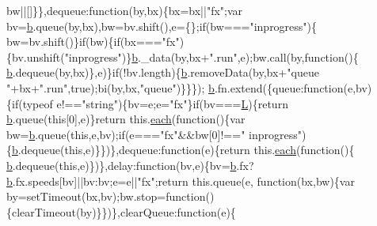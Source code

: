 \begin{DoxyCode}
      bw||[]\}\},dequeue:\textcolor{keyword}{function}(by,bx)\{bx=bx||\textcolor{stringliteral}{"fx"};var bv=\hyperlink{a00039_aa4026ad5544b958e54ce5e106fa1c805}{b}.queue(by,bx),bw=bv.shift(),e=\{\};\textcolor{keywordflow}{if}(bw===\textcolor{stringliteral}{"inprogress"})\{
      bw=bv.shift()\}\textcolor{keywordflow}{if}(bw)\{\textcolor{keywordflow}{if}(bx===\textcolor{stringliteral}{"fx"})\{bv.unshift(\textcolor{stringliteral}{"inprogress"})\}\hyperlink{a00039_aa4026ad5544b958e54ce5e106fa1c805}{b}.\_data(by,bx+\textcolor{stringliteral}{".run"},e);bw.call(by,\textcolor{keyword}{function}()\{
      \hyperlink{a00039_aa4026ad5544b958e54ce5e106fa1c805}{b}.dequeue(by,bx)\},e)\}\textcolor{keywordflow}{if}(!bv.length)\{\hyperlink{a00039_aa4026ad5544b958e54ce5e106fa1c805}{b}.removeData(by,bx+\textcolor{stringliteral}{"queue "}+bx+\textcolor{stringliteral}{".run"},\textcolor{keyword}{true});bi(by,bx,\textcolor{stringliteral}{"queue"})\}\}\});
      \hyperlink{a00039_aa4026ad5544b958e54ce5e106fa1c805}{b}.fn.extend(\{queue:\textcolor{keyword}{function}(e,bv)\{\textcolor{keywordflow}{if}(typeof e!==\textcolor{stringliteral}{"string"})\{bv=e;e=\textcolor{stringliteral}{"fx"}\}\textcolor{keywordflow}{if}(bv===\hyperlink{a00039_a38ee4c0b5f4fe2a18d0c783af540d253}{L})\{\textcolor{keywordflow}{return} 
      \hyperlink{a00039_aa4026ad5544b958e54ce5e106fa1c805}{b}.queue(\textcolor{keyword}{this}[0],e)\}\textcolor{keywordflow}{return} this.\hyperlink{a00039_a871ff39db627c54c710a3e9909b8234c}{each}(\textcolor{keyword}{function}()\{var bw=\hyperlink{a00039_aa4026ad5544b958e54ce5e106fa1c805}{b}.queue(\textcolor{keyword}{this},e,bv);\textcolor{keywordflow}{if}(e===\textcolor{stringliteral}{"fx"}&&bw[0]!==\textcolor{stringliteral}{"
      inprogress"})\{\hyperlink{a00039_aa4026ad5544b958e54ce5e106fa1c805}{b}.dequeue(\textcolor{keyword}{this},e)\}\})\},dequeue:\textcolor{keyword}{function}(e)\{\textcolor{keywordflow}{return} this.\hyperlink{a00039_a871ff39db627c54c710a3e9909b8234c}{each}(\textcolor{keyword}{function}()\{
      \hyperlink{a00039_aa4026ad5544b958e54ce5e106fa1c805}{b}.dequeue(\textcolor{keyword}{this},e)\})\},delay:\textcolor{keyword}{function}(bv,e)\{bv=\hyperlink{a00039_aa4026ad5544b958e54ce5e106fa1c805}{b}.fx?\hyperlink{a00039_aa4026ad5544b958e54ce5e106fa1c805}{b}.fx.speeds[bv]||bv:bv;e=e||\textcolor{stringliteral}{"fx"};\textcolor{keywordflow}{return} this.queue(e,\textcolor{keyword}{
      function}(bx,bw)\{var by=setTimeout(bx,bv);bw.stop=\textcolor{keyword}{function}()\{clearTimeout(by)\}\})\},clearQueue:\textcolor{keyword}{function}(e)\{\textcolor{keywordflow}{
}
\end{DoxyCode}
